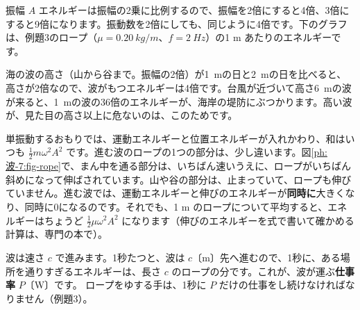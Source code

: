 \begin{phbaisuru}{振幅 $A$}
エネルギーは振幅の2乗に比例するので、振幅を2倍にすると4倍、3倍にすると9倍になります。振動数を2倍にしても、同じように4倍です。下のグラフは、例題3のロープ（$\mu=\qty{0.20}{kg/m}$、$f=\qty{2}{Hz}$）の1 m あたりのエネルギーです。
\par\smallskip\noindent{}
\end{phbaisuru}

\begin{phmijika}[海の波と台風の高波]
海の波の高さ（山から谷まで。振幅の2倍）が\qty{1}{m}の日と\qty{2}{m}の日を比べると、高さが2倍なので、波がもつエネルギーは4倍です。台風が近づいて高さ\qty{6}{m}の波が来ると、\qty{1}{m}の波の36倍のエネルギーが、海岸の堤防にぶつかります。高い波が、見た目の高さ以上に危ないのは、このためです。
\end{phmijika}

\begin{seikaku}
単振動するおもりでは、運動エネルギーと位置エネルギーが入れかわり、和はいつも $\tfrac12m\omega^2A^2$ です。進む波のロープの1つの部分は、少し違います。図\ref{ph:波-7:fig-rope}で、まん中を通る部分は、いちばん速いうえに、ロープがいちばん斜めになって伸ばされています。山や谷の部分は、止まっていて、ロープも伸びていません。進む波では、運動エネルギーと伸びのエネルギーが\textbf{同時に}大きくなり、同時に0になるのです。それでも、1 m のロープについて平均すると、エネルギーはちょうど $\tfrac12\mu\omega^2A^2$ になります（伸びのエネルギーを式で書いて確かめる計算は、専門の本で）。
\end{seikaku}

波は速さ $c$ で進みます。1秒たつと、波は $c$〔m〕先へ進むので、1秒に、ある場所を通りすぎるエネルギーは、長さ $c$ のロープの分です。これが、波が運ぶ\textbf{仕事率} $P$〔W〕です。
\label{ph:波-7:power}ロープをゆする手は、1秒に $P$ だけの仕事をし続けなければなりません（例題3）。

